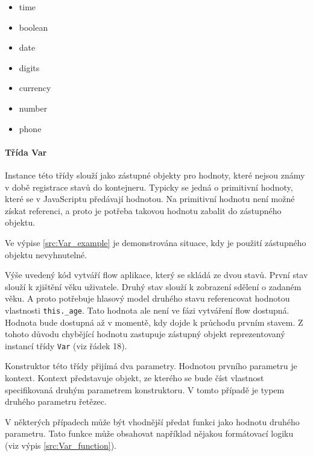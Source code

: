 \documentclass[ing,male,java,dept460]{diploma}						%
\begin{document}
\begin{itemize}
\item time
\item boolean
\item date
\item digits
\item currency
\item number
\item phone
\end{itemize}

\paragraph{Třída Var}
\label{sec:Var}
Instance této třídy slouží jako zástupné objekty pro hodnoty, které nejsou známy v době registrace stavů do kontejneru. Typicky se jedná o primitivní hodnoty, které se v JavaScriptu předávají hodnotou. Na primitivní hodnotu není možné získat referenci, a proto je potřeba takovou hodnotu zabalit do zástupného objektu.

Ve výpise \ref{src:Var_example} je demonstrována situace, kdy je použití zástupného objektu nevyhnutelné.



Výše uvedený kód vytváří flow aplikace, který se skládá ze dvou stavů. První stav slouží k zjištění věku uživatele. Druhý stav slouží k zobrazení sdělení o zadaném věku. A proto potřebuje hlasový model druhého stavu referencovat hodnotou vlastnosti \mbox{\texttt{this.\_age}}. Tato hodnota ale není ve fázi vytváření flow dostupná. Hodnota bude dostupná až v momentě, kdy dojde k průchodu prvním stavem. Z tohoto důvodu chybějící hodnotu zastupuje zástupný objekt reprezentovaný instancí třídy \texttt{Var} (viz řádek 18).

Konstruktor této třídy přijímá dva parametry. Hodnotou prvního parametru je kontext. Kontext představuje objekt, ze kterého se bude číst vlastnost specifikovaná druhým parametrem konstruktoru. V tomto případě je typem druhého parametru řetězec.

V některých případech může být vhodnější předat funkci jako hodnotu druhého parametru. Tato funkce může obsahovat například nějakou formátovací logiku (viz výpis \ref{src:Var_function}).


\end{document}
